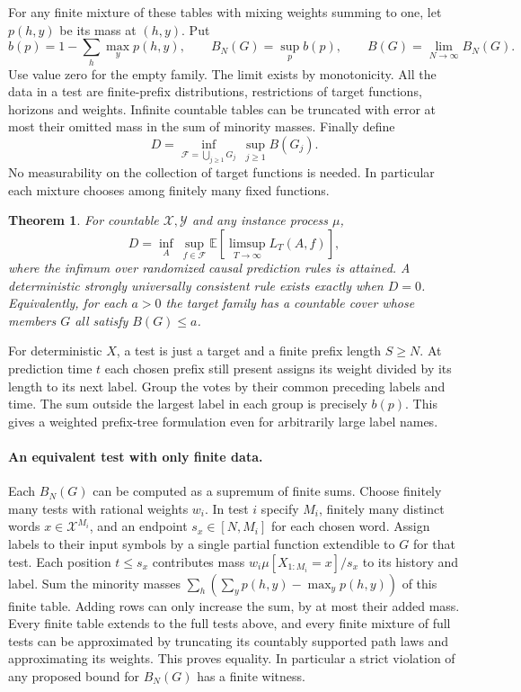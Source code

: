 \documentclass[11pt]{article}
\newtheorem{theorem}{Theorem}
\newcommand{\E}{\mathbb E}
\newcommand{\F}{\mathcal F}
\begin{document}
For any finite mixture of these tables with mixing weights summing to one, let $p(h,y)$ be its mass at $(h,y)$. Put
\[
 b(p)=1-\sum_h\max_y p(h,y),\qquad
 B_N(G)=\sup_{p} b(p),\qquad B(G)=\lim_{N\to\infty} B_N(G).
\]
Use value zero for the empty family. The limit exists by monotonicity. All the data in a test are finite-prefix distributions, restrictions of target functions, horizons and weights. Infinite countable tables can be truncated with error at most their omitted mass in the sum of minority masses. Finally define
\begin{equation}\label{D}
 D=\inf_{\F=\bigcup_{j\ge1}G_j}\ \sup_{j\ge1} B(G_j).
\end{equation}
No measurability on the collection of target functions is needed. In particular each mixture chooses among finitely many fixed functions.

\begin{theorem}\label{main}
For countable $\mathcal X,\mathcal Y$ and any instance process $\mu$,
\[
 D=\inf_A\ \sup_{f\in\F}\E\!\left[\limsup_{T\to\infty} L_T(A,f)\right],
\]
where the infimum over randomized causal prediction rules is attained. A deterministic strongly universally consistent rule exists exactly when $D=0$. Equivalently, for each $a>0$ the target family has a countable cover whose members $G$ all satisfy $B(G)\le a$.
\end{theorem}

For deterministic $X$, a test is just a target and a finite prefix length $S\ge N$. At prediction time $t$ each chosen prefix still present assigns its weight divided by its length to its next label. Group the votes by their common preceding labels and time. The sum outside the largest label in each group is precisely $b(p)$. This gives a weighted prefix-tree formulation even for arbitrarily large label names.

\paragraph{An equivalent test with only finite data.}
Each $B_N(G)$ can be computed as a supremum of finite sums. Choose finitely many tests with rational weights $w_i$. In test $i$ specify $M_i$, finitely many distinct words $x\in\mathcal X^{M_i}$, and an endpoint $s_x\in[N,M_i]$ for each chosen word. Assign labels to their input symbols by a single partial function extendible to $G$ for that test. Each position $t\le s_x$ contributes mass $w_i\mu[X_{1:M_i}=x]/s_x$ to its history and label. Sum the minority masses $\sum_h(\sum_y p(h,y)-\max_y p(h,y))$ of this finite table. Adding rows can only increase the sum, by at most their added mass. Every finite table extends to the full tests above, and every finite mixture of full tests can be approximated by truncating its countably supported path laws and approximating its weights. This proves equality. In particular a strict violation of any proposed bound for $B_N(G)$ has a finite witness.
\end{document}
